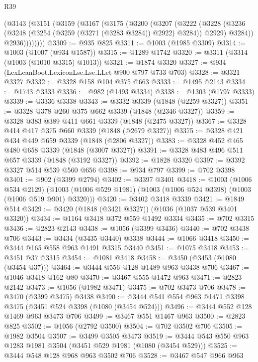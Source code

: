\begin{lexlean}{R39}
\begin{coremodule}
      (@3143
        (@3151
          (@3159
            (@3167
              (@3175
                (@3200
                  (@3207
                    (@3222
                      (@3228
                        (@3236 (@3248 (@3254 (@3259 (@3271 (@3283 @3284)) @2922) @3284)) @2929)
                        @3284))
                    @2936))))))))
@3309 := @935 @825
@3311 := @1003 (@1985 @3309)
@3314 := @1003 (@1007 (@934 @1587))
@3315 := @1289 @1742
@3320 := @3311 (@3314 (@1003 (@1010 @3315) @1013))
@3321 := @1874 @3320
@3327 := @934 (LexLeanBoot.LexiconLse.Lse.LLet @900 @797 @733 @703)
@3328 := @3321 @3327
@3332 := @3328 @158 @104 @375 @663
@3333 := @1495 @2143
@3334 := @1743 @3333
@3336 := @982 (@1493 @3334)
@3338 := @1303 (@1797 @3333)
@3339 := @3336 @3338
@3343 := @3332 @3339 (@1848 (@2259 @3327))
@3351 := @3328 @378 @260 @375 @662 @3339 (@1848 (@2346 @3327))
@3359 := @3328 @383 @389 @411 @661 @3339 (@1848 (@2475 @3327))
@3367 := @3328 @414 @417 @375 @660 @3339 (@1848 (@2679 @3327))
@3375 := @3328 @421 @434 @449 @659 @3339 (@1848 (@2806 @3327))
@3383 := @3328 @452 @465 @480 @658 @3339 (@1848 (@3007 @3327))
@3391 := @3328 @483 @496 @511 @657 @3339 (@1848 (@3192 @3327))
@3392 := @1828 @3320
@3397 := @3392 @3327 @514 @539 @560 @656
@3398 := @934 @797
@3399 := @702 @3398
@3401 := @902 (@3399 @2794)
@3402 := @3397 @3401
@3418 := @1003
    (@1006 @534 @2129)
    (@1003 (@1006 @529 @1981) (@1003 (@1006 @524 @3398) (@1003 (@1006 @519 @901) @3320)))
@3420 := @3402 @3418 @3339
@3421 := @1849 @514
@3429 := @3420 (@1848 (@3421 @3327)) (@1036 (@1037 @539 @3401 @3320))
@3434 := @1164 @3418 @372 @559 @1492 @3334
@3435 := @702 @3315
@3436 := @2823 @2143
@3438 := @1056 (@3399 @3436)
@3440 := @702 @3438 @706
@3443 := @3434 (@3435 @3440) @3338
@3444 := @1066 @3418
@3450 := @3444 @165 @558 @963 @1491 @3315 @3440
@3451 := @1075 @3418
@3453 := @3451 @37 @3315
@3454 := @1081 @3418
@3458 := @3450 (@3453 (@1080 (@3454 @37)))
@3464 := @3444 @556 @128 @1489 @963 @3438 @706
@3467 := @1046 @3418 @162 @80
@3470 := @3467 @555 @1472 @963
@3471 := @2823 @2142
@3473 := @1056 (@1982 @3471)
@3475 := @702 @3473 @706
@3478 := @3470 (@3399 @3475) @3438
@3490 := @3444 @541 @554 @963 @1471 @3398 @3475 (@3451 @524 @3398 (@1080 (@3454 @524)))
@3496 := @3444 @552 @128 @1469 @963 @3473 @706
@3499 := @3467 @551 @1467 @963
@3500 := @2823 @825
@3502 := @1056 (@2792 @3500)
@3504 := @702 @3502 @706
@3505 := @1982 @3504
@3507 := @3499 @3505 @3473
@3519 := @3444 @543 @550 @963 @1283 @1981 @3504 (@3451 @529 @1981 (@1080 (@3454 @529)))
@3525 := @3444 @548 @128 @968 @963 @3502 @706
@3528 := @3467 @547 @966 @963

\end{coremodule}
\end{lexlean}
